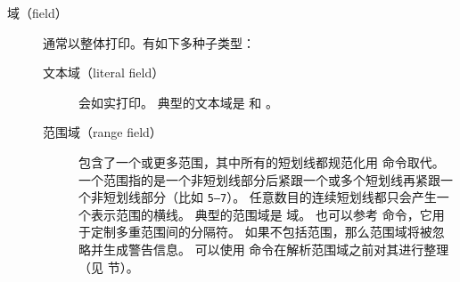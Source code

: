 \begin{description}

\item[域（field）] 通常以整体打印。有如下多种子类型：

\begin{description}

\item[文本域（literal field）]  会如实打印。
典型的文本域是  和 。


\item[范围域（range field）] 包含了一个或更多范围，其中所有的短划线都规范化用  命令取代。
一个范围指的是一个非短划线部分后紧跟一个或多个短划线再紧跟一个非短划线部分（比如 \texttt{5--7}）。
任意数目的连续短划线都只会产生一个表示范围的横线。
典型的范围域是  域。
也可以参考  命令，它用于定制多重范围间的分隔符。
如果不包括范围，那么范围域将被忽略并生成警告信息。
可以使用  命令在解析范围域之前对其进行整理（见  节）。



\end{description}
\end{description}
